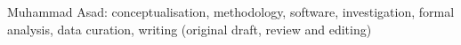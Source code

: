 Muhammad Asad: conceptualisation, methodology, software, investigation, formal analysis, data curation, writing (original draft, review and editing)
